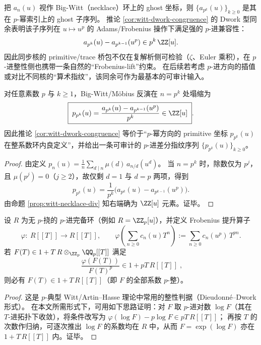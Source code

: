 \begin{remark}\label{rem:witt-ptypical-ghost}
把 \(a_n(u)\) 视作 Big-Witt（necklace）环上的 ghost 坐标，则 \(\{a_{p^k}(u)\}_{k\ge 0}\) 是其在 \(p\)-幂索引上的 ghost 子序列。
推论 \ref{cor:witt-dwork-congruence} 的 Dwork 型同余表明该子序列在 \(u\mapsto u^p\) 的 Adams/Frobenius 操作下满足强的 \(p\)-进兼容性：
\[
a_{p^k}(u)-a_{p^{k-1}}(u^p)\in p^k\,\ZZ[u].
\]
因此同步核的 primitive/trace 桥包不仅在复解析侧可检验（\(\zeta\)、Euler 乘积），在 \(p\)-进整性侧也携带一条自然的“Frobenius-lift”约束。
在后续若考虑 \(p\)-进方向的插值或对比不同核的“算术指纹”，该同余可作为最基本的可审计输入。
\end{remark}

\begin{proposition}\label{prop:witt-ppower-primitive-coordinate}
对任意素数 \(p\) 与 \(k\ge 1\)，Big-Witt/Möbius 反演在 \(n=p^k\) 处塌缩为
\[
\boxed{\;
p_{p^k}(u)=\frac{a_{p^k}(u)-a_{p^{k-1}}(u^p)}{p^k}\in\ZZ[u]\; }.
\]
因此推论 \ref{cor:witt-dwork-congruence} 等价于“\(p\)-幂方向的 primitive 坐标 \(p_{p^k}(u)\) 在整系数环内良定义”，并给出一条可审计的 \(p\)-进差分指纹序列 \(\{p_{p^k}(u)\}_{k\ge 0}\)。
\end{proposition}
\begin{proof}
由定义
\(
p_n(u)=\frac{1}{n}\sum_{d\mid n}\mu(d)\,a_{n/d}(u^d)
\)。
当 \(n=p^k\) 时，除数仅为 \(p^j\)，且 \(\mu(p^j)=0\)（\(j\ge 2\)），故仅剩 \(d=1\) 与 \(d=p\) 两项，得到
\[
p_{p^k}(u)=\frac{1}{p^k}\bigl(a_{p^k}(u)-a_{p^{k-1}}(u^p)\bigr).
\]
由命题 \ref{prop:witt-necklace-div} 知右端确为 \(\ZZ[u]\) 元素。证毕。
\end{proof}

\begin{lemma}\label{lem:witt-dieudonne-dwork}
设 \(R\) 为无 \(p\)-挠的 \(p\)-进完备环（例如 \(R=\ZZ_p[u]\)），并定义 Frobenius 提升算子
\[
\varphi:\ R[[T]]\to R[[T]],\qquad
\varphi\!\left(\sum_{n\ge 0}c_n(u)T^n\right):=\sum_{n\ge 0}c_n(u^p)\,T^{pn}.
\]
若 \(F(T)\in 1+T\,R\otimes_{\ZZ_p}\QQ_p[[T]]\) 满足
\[
\boxed{\;
\frac{\varphi(F(T))}{F(T)^p}\in 1+pT\,R[[T]]\;},
\]
则必有 \(F(T)\in 1+T\,R[[T]]\)（即 \(F\) 的全部系数 \(p\)-整）。
\end{lemma}
\begin{proof}
这是 \(p\)-典型 Witt/Artin--Hasse 理论中常用的整性判据（Dieudonn\'e--Dwork 形式）。
在本文所需形式下，可用如下思路证明：对 \(F\) 取 \(p\)-进对数 \(\log F\)（其在 \(T\)-进拓扑下收敛），将条件改写为
\(
\varphi(\log F)-p\log F\in pT\,R[[T]]
\)；
再按 \(T\) 的次数作归纳，可逐次推出 \(\log F\) 的系数均在 \(R\) 中，从而 \(F=\exp(\log F)\) 亦在 \(1+T\,R[[T]]\) 内。证毕。
\end{proof}

